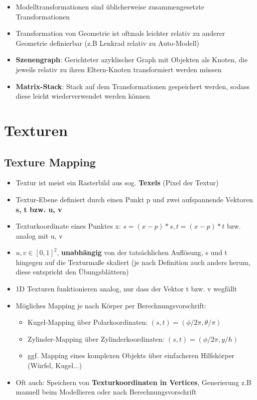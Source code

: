 \documentclass[10pt,a4paper]{article}
\begin{document}
	\begin{itemize}
		\item Modelltransformationen sind üblicherweise zusammengesetzte Transformationen
		\item Transformation von Geometrie ist oftmals leichter relativ zu anderer Geometrie definierbar (z.B Lenkrad relativ zu Auto-Modell)
		\item \textbf{Szenengraph}: Gerichteter azyklischer Graph mit Objekten als Knoten, die jeweils relativ zu ihren Eltern-Knoten transformiert werden müssen
		\item \textbf{Matrix-Stack}: Stack auf dem Transformationen gespeichert werden, sodass diese leicht wiederverwendet werden können
	\end{itemize}

	\newpage
	\section{Texturen}
	\label{tex:sec:texturen}

	\subsection{Texture Mapping}
	\label{tex:sub:texture_mapping}
	
	\begin{itemize}
		\item Textur ist meist ein Rasterbild aus sog. \textbf{Texels} (Pixel der Textur)
		\item Textur-Ebene definiert durch einen Punkt p und zwei aufspannende Vektoren \textbf{s, t bzw. u, v}
		\item Texturkoordinate eines Punktes x: $s = (x - p) * s, t = (x - p) * t$ bzw. analog mit u, v
		\item $u, v \in [0, 1]^2$, \textbf{unabhängig} von der tatsächlichen Auflösung, s und t hingegen auf die Texturmaße skaliert (je nach Definition auch anders herum, diese entspricht den Übungsblättern)
		\item 1D Texturen funktionieren analog, nur dass der Vektor t bzw. v wegfällt
		\item Mögliches Mapping je nach Körper per Berechnungsvorschrift:
		\begin{itemize}
			\item Kugel-Mapping über Polarkoordinaten: $(s, t) = (\phi / 2 \pi, \theta / \pi)$
			\item Zylinder-Mapping über Zylinderkoordinaten: $(s, t) = (\phi / 2 \pi, y / h)$
			\item ggf. Mapping eines komplexen Objekts über einfacheren Hilfskörper (Würfel, Kugel...)
		\end{itemize}
		\item Oft auch: Speichern von \textbf{Texturkoordinaten in Vertices}, Generierung z.B manuell beim Modellieren oder nach Berechnungsvorschrift
	\end{itemize}
	
\end{document}
